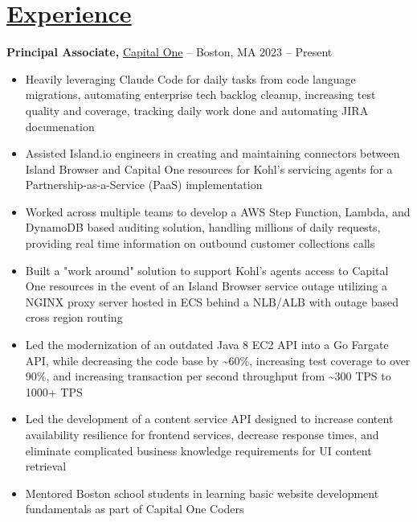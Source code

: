 \documentclass[10pt,letterpaper]{article}
\begin{document}
\section*{\href{https://www.reddit.com/r/EngineeringResumes/wiki/index\#wiki_work_experience}{Experience}}
\textbf{Principal Associate,} \href{https://www.fstl1992.com/}{Capital One} -- Boston, MA \hfill 2023 -- Present \\
\vspace{-9pt}
\begin{itemize}
  \item Heavily leveraging Claude Code for daily tasks from code language migrations, automating enterprise tech backlog cleanup, increasing test quality and coverage, tracking daily work done and automating JIRA documenation
  \item Assisted Island.io engineers in creating and maintaining connectors between Island Browser and Capital One resources for Kohl's servicing agents for a Partnership-as-a-Service (PaaS) implementation
  \item Worked across multiple teams to develop a AWS Step Function, Lambda, and DynamoDB based auditing solution, handling millions of daily requests, providing real time information on outbound customer collections calls
  \item Built a "work around" solution to support Kohl's agents access to Capital One resources in the event of an Island Browser service outage utilizing a NGINX proxy server hosted in ECS behind a NLB/ALB with outage based cross region routing
  \item Led the modernization of an outdated Java 8 EC2 API into a Go Fargate API, while decreasing the code base by \textasciitilde{}60\%, increasing test coverage to over 90\%, and increasing transaction per second throughput from \textasciitilde{}300 TPS to 1000+ TPS
  \item Led the development of a content service API designed to increase content availability resilience for frontend services, decrease response times, and eliminate complicated business knowledge requirements for UI content retrieval
  \item Mentored Boston school students in learning basic website development fundamentals as part of Capital One Coders
\end{itemize}
\end{document}

